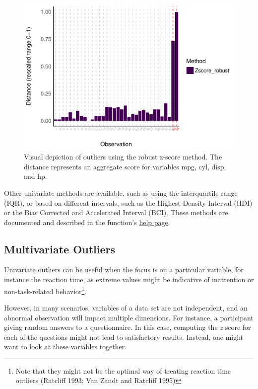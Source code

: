 \documentclass{article}
\begin{document}
\begin{figure}
\includegraphics[width=1\linewidth]{paper_files/figure-latex/univariate_implicit-1} \caption{Visual depiction of outliers using the robust z-score method. The distance represents an aggregate score for variables mpg, cyl, disp, and hp.}\label{fig:univariate_implicit}
\end{figure}

Other univariate methods are available, such as using the interquartile
range (IQR), or based on different intervals, such as the Highest
Density Interval (HDI) or the Bias Corrected and Accelerated Interval
(BCI). These methods are documented and described in the function's
\href{https://easystats.github.io/performance/reference/check_outliers.html}{help
page}.

\hypertarget{multivariate-outliers}{%
\subsection{Multivariate Outliers}\label{multivariate-outliers}}

Univariate outliers can be useful when the focus is on a particular
variable, for instance the reaction time, as extreme values might be
indicative of inattention or non-task-related behavior\footnote{ Note
  that they might not be the optimal way of treating reaction time
  outliers (Ratcliff 1993; Van Zandt and Ratcliff 1995)}.

However, in many scenarios, variables of a data set are not independent,
and an abnormal observation will impact multiple dimensions. For
instance, a participant giving random answers to a questionnaire. In
this case, computing the \emph{z} score for each of the questions might
not lead to satisfactory results. Instead, one might want to look at
these variables together.
\end{document}
